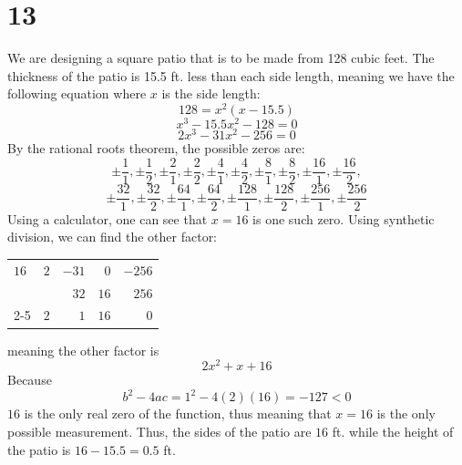 \documentclass{article}
\theoremstyle{definition}
\begin{document}
\section*{13}


We are designing a square patio that is to be made from 128 cubic feet. The thickness of the patio is 15.5 ft. less than each side length, meaning 
we have the following equation where $x$ is the side length:
\[ 128=x^2(x-15.5) \]
\[ x^3-15.5x^2-128=0 \]
\[ 2x^3-31x^2-256=0 \]
By the rational roots theorem, the possible zeros are:
\[ \pm\frac{1}{1},\pm\frac{1}{2},\pm\frac{2}{1},\pm\frac{2}{2},\pm\frac{4}{1},\pm\frac{4}{2},\pm\frac{8}{1},\pm\frac{8}{2},\pm\frac{16}{1},\pm\frac{16}{2},\]
\[ \pm\frac{32}{1},\pm\frac{32}{2},\pm\frac{64}{1},\pm\frac{64}{2},\pm\frac{128}{1},\pm\frac{128}{2},\pm\frac{256}{1},\pm\frac{256}{2} \]
Using a calculator, one can see that $x=16$ is one such zero. Using synthetic division, we can find the other factor:
\begin{center}
	\begin{tabular}{l|rrrr}
		$16$ & $2$ & $-31$ & $0$ & $-256$ \\
		& & $32$ & $16$ & $256$ \\
		\cmidrule{2-5}
		& $2$ & $1$ & $16$ & $0$
	\end{tabular}
\end{center}
meaning the other factor is \[ 2x^2+x+16 \] Because \[ b^2-4ac=1^2-4(2)(16)=-127<0 \] $16$ is the only real zero of the function, thus meaning 
that $x=16$ is the only possible measurement. Thus, the sides of the patio are $16$ ft. while the height of the patio is $16-15.5=0.5$ ft.
\end{document}
